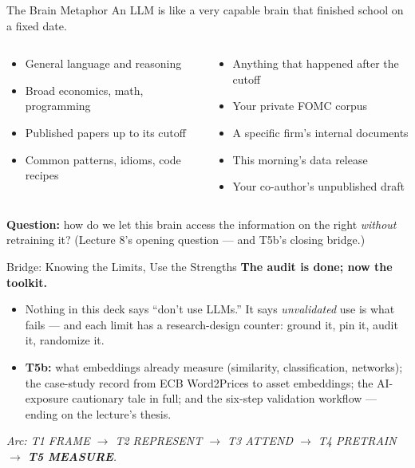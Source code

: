 \begin{frame}{The Brain Metaphor}
An LLM is like a very capable brain that finished school on a fixed date.

\medskip
\begin{columns}[T]
\begin{tcolorbox}[colback=green!5, colframe=green!40!black, title=\textbf{What the brain knows}]
\begin{itemize}
\item General language and reasoning
\item Broad economics, math, programming
\item Published papers up to its cutoff
\item Common patterns, idioms, code recipes
\end{itemize}
\end{tcolorbox}

\begin{tcolorbox}[colback=red!5, colframe=red!50!black, title=\textbf{What the brain does \emph{not} know}]
\begin{itemize}
\item Anything that happened after the cutoff
\item Your private FOMC corpus
\item A specific firm's internal documents
\item This morning's data release
\item Your co-author's unpublished draft
\end{itemize}
\end{tcolorbox}
\end{columns}

\medskip
\textbf{Question:} how do we let this brain access the information on the right \emph{without} retraining it? (Lecture 8's opening question --- and T5b's closing bridge.)
\end{frame}

\begin{frame}{Bridge: Knowing the Limits, Use the Strengths}
\textbf{The audit is done; now the toolkit.}
\begin{itemize}
\item Nothing in this deck says ``don't use LLMs.'' It says \emph{unvalidated} use is what fails --- and each limit has a research-design counter: ground it, pin it, audit it, randomize it.
\item \textbf{T5b:} what embeddings already measure (similarity, classification, networks); the case-study record from ECB Word2Prices to asset embeddings; the AI-exposure cautionary tale in full; and the six-step validation workflow --- ending on the lecture's thesis.
\end{itemize}
\bigskip
\centering\footnotesize\textit{Arc: T1 FRAME $\to$ T2 REPRESENT $\to$ T3 ATTEND $\to$ T4 PRETRAIN $\to$ \textbf{T5 MEASURE}.}
\end{frame}


